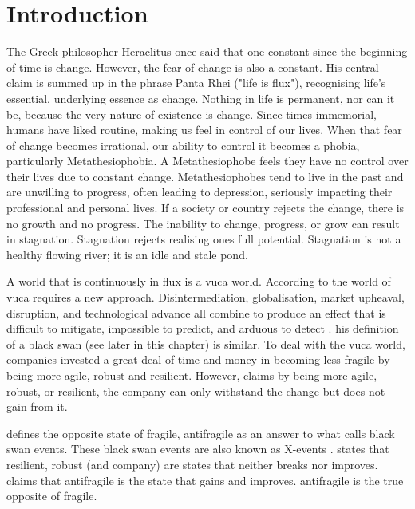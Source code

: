 \chapter{Introduction}
\label{ch:introduction}
The Greek philosopher Heraclitus once said that one constant since the beginning of time is change. However, the fear of change is also a constant.  His central claim is summed up in the phrase Panta Rhei ("life is flux"), recognising life's essential, underlying essence as change. Nothing in life is permanent, nor can it be, because the very nature of existence is change. Since times immemorial, humans have liked routine, making us feel in control of our lives. When that fear of change becomes irrational, our ability to control it becomes a phobia, particularly Metathesiophobia. A Metathesiophobe feels they have no control over their lives due to constant change. Metathesiophobes tend to live in the past and are unwilling to progress, often leading to depression, seriously impacting their professional and personal lives. If a society or country rejects the change, there is no growth and no progress. The inability to change, progress, or grow can result in stagnation. Stagnation rejects realising ones full potential. Stagnation is not a healthy flowing river; it is an idle and stale pond. \parencite{Mark2010, Arapahoe2020}

A world that is continuously in flux is a \acrfull{vuca} world. According to \textcite{Bennett2014} the world of \acrshort{vuca} requires a new approach. Disintermediation, globalisation, market upheaval, disruption, and technological advance all combine to produce an effect that is difficult to mitigate,  impossible to predict, and arduous to detect \parencite[p. 885]{OReilly2019}. \textcite{Taleb2008} his definition of a black swan (see later in this chapter) is similar. To deal with the \acrshort{vuca} world, companies invested a great deal of time and money in becoming less \gls{fragile} by being more \gls{agile}, \gls{robust} and \gls{resilient}. However, \textcite{Taleb2012} claims by being more \gls{agile}, \gls{robust}, or \gls{resilient}, the company can only withstand the change but does not gain from it.

\textcite{Taleb2012} defines the opposite state of \gls{fragile}, \gls{antifragile} as an answer to what \textcite{Taleb2008} calls black swan events. These black swan events are also known as X-events \parencite{Casti2013}. \textcite{Taleb2012} states that \gls{resilient}, \gls{robust} (and company) are states that neither breaks nor improves. \textcite{Taleb2012} claims that \gls{antifragile} is the state that gains and improves. \Gls{antifragile} is the true opposite of \gls{fragile}.

